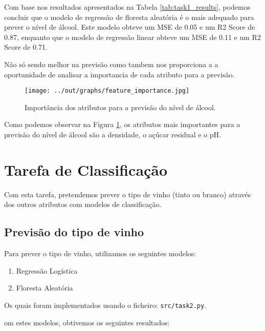 \documentclass{article}
\begin{document}
    Com base nos resultados apresentados na Tabela \ref{tab:task1_results}, podemos concluir que o modelo de regressão de floresta aleatória é o mais adequado para prever o nível de álcool. Este modelo obteve um MSE de 0.05 e um R2 Score de 0.87, enquanto que o modelo de regressão linear obteve um MSE de 0.11 e um R2 Score de 0.71.

    Não só sendo melhor na previsão como tambem nos proporciona a a oportunidade de analisar a importancia de cada atributo para a previsão.

    \begin{figure}[ht]
        \centering
        \begin{minipage}{0.90\textwidth}
            \centering
            \texttt{[image: ../out/graphs/feature\_importance.jpg]}
            \caption{Importância dos atributos para a previsão do nível de álcool.}
            \label{fig:task1_feature_importance}
        \end{minipage}
    \end{figure}

    Como podemos observar na Figura \ref{fig:task1_feature_importance}, os atributos mais importantes para a previsão do nível de álcool são a densidade, o açúcar residual e o pH.


    \section{Tarefa de Classificação}

    Com esta tarefa, pretendemos prever o tipo de vinho (tinto ou branco) através dos outros atributos com modelos de classificação.

    \subsection{Previsão do tipo de vinho}

    Para prever o tipo de vinho, utilizamos os seguintes modelos:

    \begin{enumerate}
        \item Regressão Logística
        \item Floresta Aleatória
    \end{enumerate}

    Os quais foram implementados usando o ficheiro: \texttt{src/task2.py}.

    om estes modelos, obtivemos os seguintes resultados:
\end{document}

